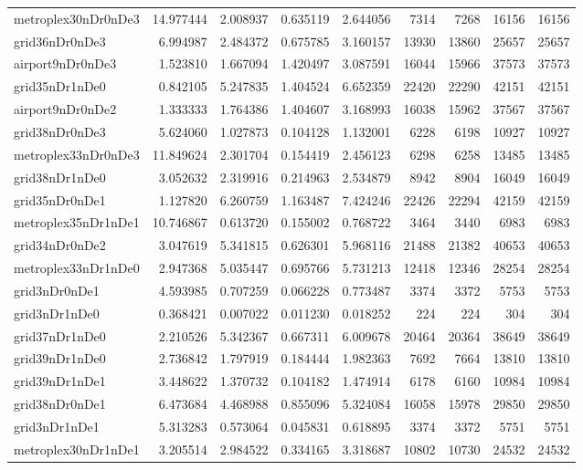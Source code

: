 \begin{longtable}{|l|r|r|r|r|r|r|r|r|}
metroplex30nDr0nDe3 & 14.977444 & 2.008937 & 0.635119 & 2.644056 & 7314 & 7268 & 16156 & 16156 \\
grid36nDr0nDe3 & 6.994987 & 2.484372 & 0.675785 & 3.160157 & 13930 & 13860 & 25657 & 25657 \\
airport9nDr0nDe3 & 1.523810 & 1.667094 & 1.420497 & 3.087591 & 16044 & 15966 & 37573 & 37573 \\
grid35nDr1nDe0 & 0.842105 & 5.247835 & 1.404524 & 6.652359 & 22420 & 22290 & 42151 & 42151 \\
airport9nDr0nDe2 & 1.333333 & 1.764386 & 1.404607 & 3.168993 & 16038 & 15962 & 37567 & 37567 \\
grid38nDr0nDe3 & 5.624060 & 1.027873 & 0.104128 & 1.132001 & 6228 & 6198 & 10927 & 10927 \\
metroplex33nDr0nDe3 & 11.849624 & 2.301704 & 0.154419 & 2.456123 & 6298 & 6258 & 13485 & 13485 \\
grid38nDr1nDe0 & 3.052632 & 2.319916 & 0.214963 & 2.534879 & 8942 & 8904 & 16049 & 16049 \\
grid35nDr0nDe1 & 1.127820 & 6.260759 & 1.163487 & 7.424246 & 22426 & 22294 & 42159 & 42159 \\
metroplex35nDr1nDe1 & 10.746867 & 0.613720 & 0.155002 & 0.768722 & 3464 & 3440 & 6983 & 6983 \\
grid34nDr0nDe2 & 3.047619 & 5.341815 & 0.626301 & 5.968116 & 21488 & 21382 & 40653 & 40653 \\
metroplex33nDr1nDe0 & 2.947368 & 5.035447 & 0.695766 & 5.731213 & 12418 & 12346 & 28254 & 28254 \\
grid3nDr0nDe1 & 4.593985 & 0.707259 & 0.066228 & 0.773487 & 3374 & 3372 & 5753 & 5753 \\
grid3nDr1nDe0 & 0.368421 & 0.007022 & 0.011230 & 0.018252 & 224 & 224 & 304 & 304 \\
grid37nDr1nDe0 & 2.210526 & 5.342367 & 0.667311 & 6.009678 & 20464 & 20364 & 38649 & 38649 \\
grid39nDr1nDe0 & 2.736842 & 1.797919 & 0.184444 & 1.982363 & 7692 & 7664 & 13810 & 13810 \\
grid39nDr1nDe1 & 3.448622 & 1.370732 & 0.104182 & 1.474914 & 6178 & 6160 & 10984 & 10984 \\
grid38nDr0nDe1 & 6.473684 & 4.468988 & 0.855096 & 5.324084 & 16058 & 15978 & 29850 & 29850 \\
grid3nDr1nDe1 & 5.313283 & 0.573064 & 0.045831 & 0.618895 & 3374 & 3372 & 5751 & 5751 \\
metroplex30nDr1nDe1 & 3.205514 & 2.984522 & 0.334165 & 3.318687 & 10802 & 10730 & 24532 & 24532 \\

\end{longtable}
